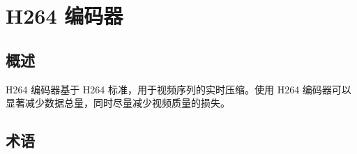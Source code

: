 \documentclass[main\_\_CN.tex]{subfiles}
\begin{document}

\ifglobal
\else
    {\let\clearpage\relax \listoftodos}
    {\let\clearpage\relax \listofdonetodos}
    \tableofcontents
\fi




\hypertarget{h264enc}{}
\chapter{H264 编码器}\label{mod:h264enc}

\section{概述}

H264 编码器基于 H264 标准，用于视频序列的实时压缩。使用 H264 编码器可以显著减少数据总量，同时尽量减少视频质量的损失。



\section{术语}
\end{document}
